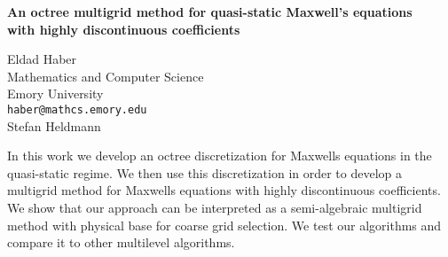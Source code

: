 \documentclass{report}
\begin{document}

\begin{center}
{\large
{\bf An octree multigrid method for quasi-static Maxwell's equations \\
	with highly discontinuous coefficients}}

	Eldad Haber \\
	Mathematics and Computer Science \\
	Emory University \\
	{\tt haber@mathcs.emory.edu}
	\\ Stefan Heldmann
\end{center}
In this work we develop an octree discretization for
Maxwells equations in the quasi-static regime.  We then use
this discretization in order to develop a multigrid method
for Maxwells equations with highly discontinuous
coefficients.  We show that our approach can be interpreted
as a semi-algebraic multigrid method with physical base for
coarse grid selection.  We test our algorithms and compare
it to other multilevel algorithms.


\end{document}
